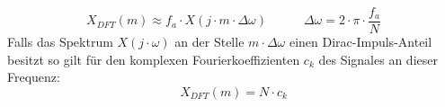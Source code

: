 \begin{equation}
X_{DFT}(m) \approx f_a \cdot X(j\cdot m \cdot \Delta \omega) \hspace{35pt} \Delta\omega = 2\cdot \pi \cdot \frac{f_a}{N}
\end{equation}
Falls das Spektrum $X(j\cdot\omega)$ an der Stelle $m\cdot \Delta \omega$ einen Dirac-Impuls-Anteil besitzt so gilt für den komplexen Fourierkoeffizienten $c_k$ des Signales an dieser Frequenz:
\begin{equation}
X_{DFT}(m) = N \cdot c_k
\end{equation}